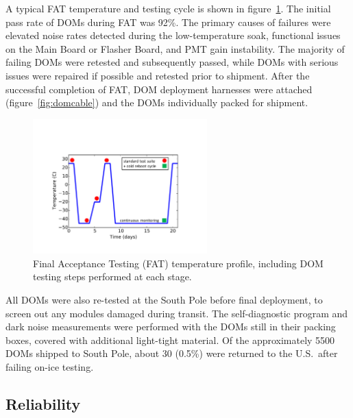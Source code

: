 A typical FAT temperature and testing cycle is shown in
figure~\ref{fig:fat_cycle}. The initial pass rate of DOMs during FAT was
92\%.  The primary causes of failures were elevated noise rates detected during the
low-temperature soak, functional issues on the Main Board or Flasher Board,
and PMT gain instability.  The majority of failing DOMs were retested and
subsequently passed, while DOMs with serious issues were repaired if possible and
retested prior to shipment. After the successful completion of FAT, DOM
deployment harnesses were attached (figure~\ref{fig:domcable}) and the
DOMs individually packed for shipment. 

\begin{figure}[!h]
 \centering
 \includegraphics[width=0.6\textwidth]{graphics/dom/production/fat_cycle.pdf}
 \caption{Final Acceptance Testing (FAT) temperature profile, including
   DOM testing steps performed at each stage.}
 \label{fig:fat_cycle}
\end{figure}

All DOMs were also re-tested at the South Pole before final deployment, to
screen out any modules damaged during transit.  The self-diagnostic
program and dark noise measurements were performed with the DOMs still in
their packing boxes, covered with additional light-tight material.  Of the
approximately 5500 DOMs shipped to South Pole, about 30 (0.5\%) were
returned to the U.S.~after failing on-ice testing.    

\subsection{\label{sec:reliability}Reliability}

